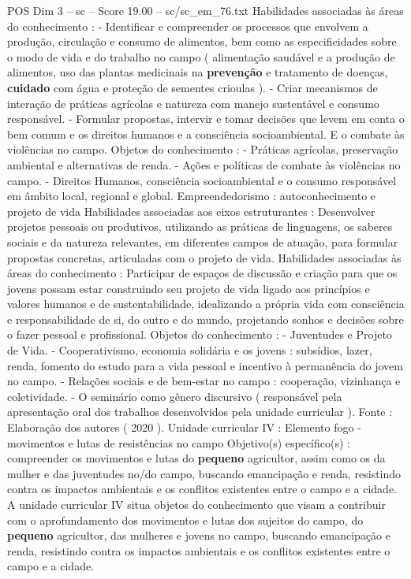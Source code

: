 \begin{textsample}{POS Dim 3 – sc – Score 19.00 – sc/sc\_em\_76.txt}
Habilidades associadas às áreas do conhecimento : - Identificar e compreender os processos que envolvem a produção, circulação e consumo de alimentos, bem como as especificidades sobre o modo de vida e do trabalho no campo ( alimentação saudável e a produção de alimentos, uso das plantas medicinais na \textbf{prevenção} e tratamento de doenças, \textbf{cuidado} com água e proteção de sementes crioulas ). - Criar mecanismos de interação de práticas agrícolas e natureza com manejo sustentável e consumo responsável. - Formular propostas, intervir e tomar decisões que levem em conta o bem comum e os direitos humanos e a consciência socioambiental.
E o combate às violências no campo.
Objetos do conhecimento : - Práticas agrícolas, preservação ambiental e alternativas de renda. - Ações e políticas de combate às violências no campo. - Direitos Humanos, consciência socioambiental e o consumo responsável em âmbito local, regional e global.
Empreendedorismo : autoconhecimento e projeto de vida Habilidades associadas aos eixos estruturantes : Desenvolver projetos pessoais ou produtivos, utilizando as práticas de linguagens, os saberes sociais e da natureza relevantes, em diferentes campos de atuação, para formular propostas concretas, articuladas com o projeto de vida.
Habilidades associadas às áreas do conhecimento : Participar de espaços de discussão e criação para que os jovens possam estar construindo seu projeto de vida ligado aos princípios e valores humanos e de sustentabilidade, idealizando a própria vida com consciência e responsabilidade de si, do outro e do mundo, projetando sonhos e decisões sobre o fazer pessoal e profissional.
Objetos do conhecimento : - Juventudes e Projeto de Vida. - Cooperativismo, economia solidária e os jovens : subsídios, lazer, renda, fomento do estudo para a vida pessoal e incentivo à permanência do jovem no campo. - Relações sociais e de bem-estar no campo : cooperação, vizinhança e coletividade. - O seminário como gênero discursivo ( responsável pela apresentação oral dos trabalhos desenvolvidos pela unidade curricular ).
Fonte : Elaboração dos autores ( 2020 ).
Unidade curricular IV : Elemento fogo - movimentos e lutas de resistências no campo Objetivo(s) específico(s) : compreender os movimentos e lutas do \textbf{pequeno} agricultor, assim como os da mulher e das juventudes no/do campo, buscando emancipação e renda, resistindo contra os impactos ambientais e os conflitos existentes entre o campo e a cidade.
A unidade curricular IV situa objetos do conhecimento que visam a contribuir com o aprofundamento dos movimentos e lutas dos sujeitos do campo, do \textbf{pequeno} agricultor, das mulheres e jovens no campo, buscando emancipação e renda, resistindo contra os impactos ambientais e os conflitos existentes entre o campo e a cidade.

\end{textsample}
